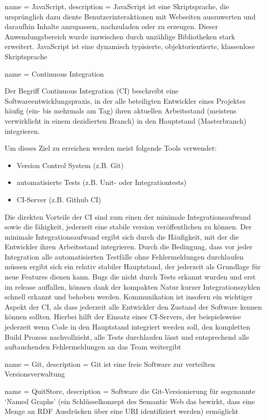 {
    name = JavaScript,
    description = {
        JavaScript ist eine Skriptsprache, die ursprünglich dazu diente 
        Benutzerinteraktionen mit Webseiten auszuwerten und daraufhin Inhalte 
        anzupassen, nachzuladen oder zu erzeugen. Dieser Anwendungsbereich wurde 
        inzwischen durch unzählige Bibliotheken stark erweitert. JavaScript ist 
        eine dynamisch typisierte, objektorientierte, klassenlose Skriptsprache
    }
}

{
    name = Continuous Integration
}
{
    Der Begriff Continuous Integration (CI) beschreibt eine 
    Softwareentwicklungspraxis, in der alle beteiligten Entwickler eines 
    Projektes häufig (ein- bis mehrmals am Tag) ihren aktuellen
    Arbeitsstand (meistens verwirklicht in einem dezidierten Branch) in den 
    Hauptstand (Masterbranch) integrieren.

    Um dieses Ziel zu erreichen werden meist folgende Tools verwendet:

    \begin{itemize}
        \item Version Control System (z.B. Git)
        \item automatisierte Tests (z.B. Unit- oder Integrationtests)
        \item CI-Server (z.B. Github CI)
    \end{itemize}

    Die direkten Vorteile der CI sind zum einen der minimale Integrationsaufwand 
    sowie die fähigkeit, jederzeit eine stabile version veröffentlichen zu 
    können.
    Der minimale Integrationsaufwand ergibt sich durch die Häufigkeit,
    mit der die Entwickler ihren Arbeitsstand integrieren. Durch die
    Bedingung, dass vor jeder Integration alle automatisierten Testfälle ohne 
    Fehlermeldungen durchlaufen müssen ergibt sich ein relativ stabiler 
    Hauptstand, der jederzeit als Grundlage für neue Features dienen kann.
    Bugs die nicht durch Tests erkannt wurden und erst im release auffallen, 
    können dank der kompakten Natur kurzer Integrationszyklen schnell erkannt 
    und behoben werden.
    Kommunikation ist insofern ein wichtiger Aspekt der CI, als dass jederzeit 
    alle Entwickler den Zustand der Software kennen können sollten. Hierbei 
    hilft der Einsatz eines CI-Servers, der beispielsweise jederzeit wenn Code 
    in den Hauptstand integriert werden soll, den kompletten Build Prozess 
    nachvollzieht, alle Tests durchlaufen lässt und entsprechend alle
    auftauchenden Fehlermeldungen an das Team weitergibt
}

 {
    name = Git,
    description = {
        Git ist eine freie Software zur verteilten Versionsverwaltung
    }
}

 {
    name = QuitStore, 
    description = {
        Software die Git-Versionierung für sogenannte `Named Graphs' (ein 
        Schlüsselkonzept des Semantic Web das bewirkt, dass eine Menge an RDF 
        Ausdrücken über eine URI identifiziert werden) ermöglicht
    }
}